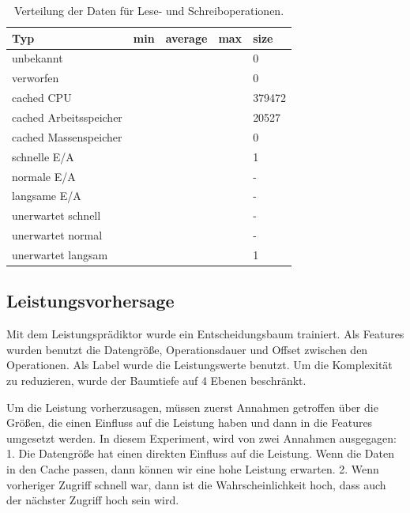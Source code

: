 \begin{table}
	\centering
	\begin{tabular}{l|llll}
		Typ                    & min & average & max & size \\
		\hline
		unbekannt              &     &         &     & 0\\
		verworfen              &     &         &     & 0\\
		cached CPU             &     &         &     & 379472\\
		cached Arbeitsspeicher &     &         &     & 20527\\
		cached Massenspeicher  &     &         &     & 0\\
		schnelle E/A           &     &         &     & 1\\
		normale E/A            &     &         &     & -\\
		langsame E/A           &     &         &     & -\\
		unerwartet schnell     &     &         &     & -\\
		unerwartet normal      &     &         &     & -\\
		unerwartet langsam     &     &         &     & 1 
	\end{tabular}
	\caption{Verteilung der Daten für Lese- und Schreiboperationen.}
\end{table}

\subsection{Leistungsvorhersage}

Mit dem Leistungsprädiktor wurde ein Entscheidungsbaum trainiert.
Als Features wurden benutzt die Datengröße, Operationsdauer und Offset zwischen den Operationen.
Als Label wurde die Leistungswerte benutzt.
Um die Komplexität zu reduzieren, wurde der Baumtiefe auf 4 Ebenen beschränkt.

Um die Leistung vorherzusagen, müssen zuerst Annahmen getroffen über die Größen, die einen Einfluss auf die Leistung haben und dann in die Features umgesetzt werden.
In diesem Experiment, wird von zwei Annahmen ausgegagen:
1. Die Datengröße hat einen direkten Einfluss auf die Leistung.
Wenn die Daten in den Cache passen, dann können wir eine hohe Leistung erwarten.
2. Wenn vorheriger Zugriff schnell war, dann ist die Wahrscheinlichkeit hoch, dass auch der nächster Zugriff hoch sein wird.


